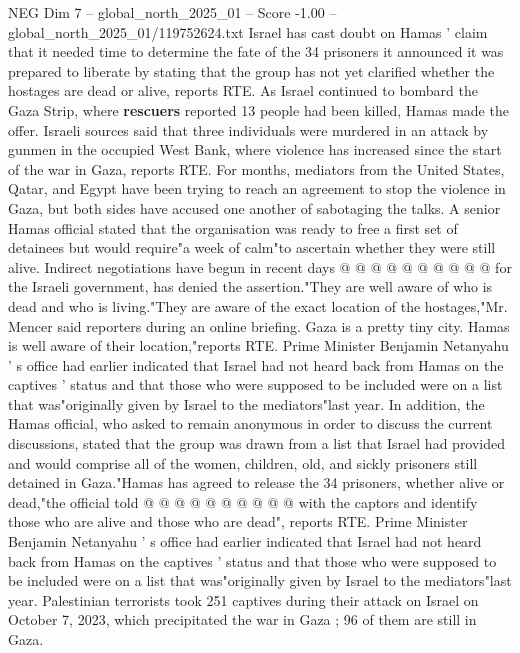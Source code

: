 \begin{textsample}{NEG Dim 7 – global\_north\_2025\_01 – Score -1.00 – global\_north\_2025\_01/119752624.txt}  \label{ex:f7_neg_185}
Israel has cast doubt on Hamas ' claim that it needed time to determine the fate of the 34 prisoners it announced it was prepared to liberate by stating that the group has not yet clarified whether the hostages are dead or alive, reports RTE.
As Israel continued to bombard the Gaza Strip, where \textbf{rescuers} reported 13 people had been killed, Hamas made the offer.
Israeli sources said that three individuals were murdered in an attack by gunmen in the occupied West Bank, where violence has increased since the start of the war in Gaza, reports RTE.
For months, mediators from the United States, Qatar, and Egypt have been trying to reach an agreement to stop the violence in Gaza, but both sides have accused one another of sabotaging the talks.
A senior Hamas official stated that the organisation was ready to free a first set of detainees but would require"a week of calm"to ascertain whether they were still alive.
Indirect negotiations have begun in recent days @ @ @ @ @ @ @ @ @ @ for the Israeli government, has denied the assertion."They are well aware of who is dead and who is living."They are aware of the exact location of the hostages,"Mr.
Mencer said reporters during an online briefing.
Gaza is a pretty tiny city.
Hamas is well aware of their location,"reports RTE.
Prime Minister Benjamin Netanyahu ' s office had earlier indicated that Israel had not heard back from Hamas on the captives ' status and that those who were supposed to be included were on a list that was"originally given by Israel to the mediators"last year.
In addition, the Hamas official, who asked to remain anonymous in order to discuss the current discussions, stated that the group was drawn from a list that Israel had provided and would comprise all of the women, children, old, and sickly prisoners still detained in Gaza."Hamas has agreed to release the 34 prisoners, whether alive or dead,"the official told @ @ @ @ @ @ @ @ @ @ with the captors and identify those who are alive and those who are dead", reports RTE.
Prime Minister Benjamin Netanyahu ' s office had earlier indicated that Israel had not heard back from Hamas on the captives ' status and that those who were supposed to be included were on a list that was"originally given by Israel to the mediators"last year.
Palestinian terrorists took 251 captives during their attack on Israel on October 7, 2023, which precipitated the war in Gaza ; 96 of them are still in Gaza.

\end{textsample}
